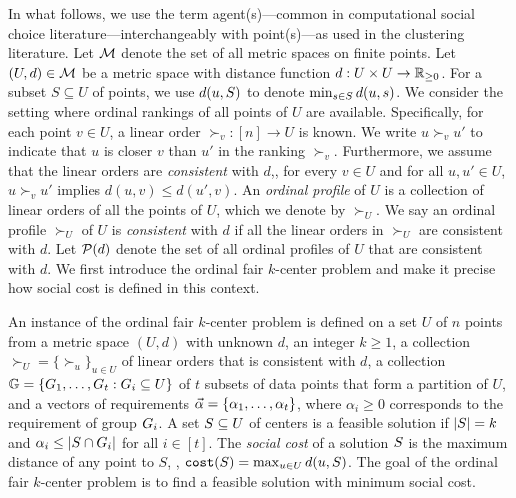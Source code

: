 In what follows, we use the term agent(s)---common in computational social choice literature---interchangeably with point(s)---as used in the clustering literature. 
Let $\mathcal{M}$ denote the set of all metric spaces on finite points.
Let $(U, d) \in \mathcal{M}$ be a metric space with distance function $d: U \times U \rightarrow \mathbb{R}_{\ge 0}$.
For a subset $S \subseteq U$ of points, we use $d(u,S)$ to denote $\min_{s \in S} d(u, s)$. 
We consider the setting where ordinal rankings of all points of $U$ are available. 
Specifically, for each point $v \in U$, a linear order $\succ_v: [n] \rightarrow U$ is known. We write $u \succ_{v} u'$ to indicate that $u$ is closer $v$ than $u'$ in the ranking $\succ_v$. 
Furthermore, we assume that the linear orders are \emph{consistent} with $d$,\ie, for every $v \in U$ and for all $u, u' \in U$, $u \succ_v u'$ implies $d(u, v) \leq d(u', v)$. 
An \emph{ordinal profile} of $U$ is a collection of linear orders of all the points of $U$, which we denote by $\succ_U$.
We say an ordinal profile $\succ_U$ of $U$ is \emph{consistent} with $d$ if all the linear orders in $\succ_U$ are consistent with $d$.
Let $\mathcal{P}(d)$ denote the set of all ordinal profiles of $U$ that are consistent with $d$.
We first introduce the ordinal fair $k$-center problem and make it precise how social cost is defined in this context.

\begin{definition}
\label{def:ordinal-fair-k-center-with-limited-distance-queries}
An instance of the ordinal fair $k$-center problem is defined on a set $U$ of $n$ points from a metric space $(U,d)$ with unknown $d$, an integer $k \geq  1$, a collection $\succ_U=\{\succ_u\}_{u \in U}$ of linear orders that is  consistent with $d$, a collection $\mathbb{G}= \{G_1, \dots, G_t : G_i \subseteq U\}$ of $t$ subsets of data points 
that form a partition of $U$,
and a vectors of requirements $\vec{\alpha} = \{\alpha_1,\dots,\alpha_t\}$, where $\alpha_i \ge 0$ corresponds to the requirement of group $G_i$. A set $S \subseteq U$ of centers is a feasible solution if $|S| = k$ and $\alpha_i \leq |S \cap G_i|$ for all $i \in [t]$. 
The \emph{social cost} of a solution $S$ is the maximum distance of any point to $S$, \ie, $\texttt{cost}(S) = \max_{u \in U} d(u,S)$. The goal of the ordinal fair $k$-center problem is to find a feasible solution with minimum social cost.
\end{definition}


